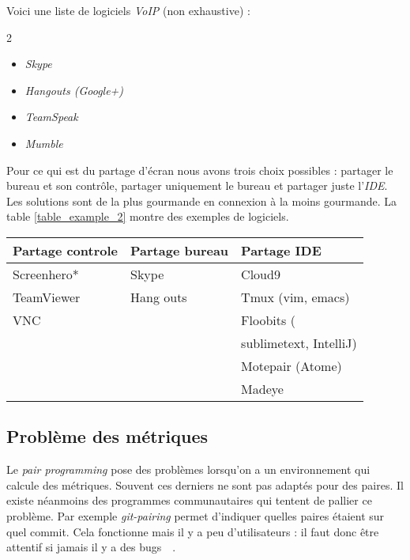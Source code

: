 \documentclass[journal, a4paper, frenchb]{IEEEtran}
\begin{document}
Voici une liste de logiciels \emph{VoIP} (non exhaustive) :

\begin{multicols}{2}
\begin{itemize}
    \item \emph{Skype}
    \item \emph{Hangouts (Google+)}
    \item \emph{TeamSpeak}
    \item \emph{Mumble}
\end{itemize}
\end{multicols}

Pour ce qui est du partage d’écran nous avons trois choix possibles : partager le bureau et son contrôle, partager uniquement le bureau et partager juste l’\emph{IDE}. Les solutions sont de la plus gourmande en connexion à la moins gourmande. La table \ref{table_example_2} montre des exemples de logiciels.

\begin{table*}[!t]
\begin{center}
    \caption{An Example of a Table 2}
    \label{table_example_2}
    \begin{tabular}{| l | l | l|}
    \hline
    Partage controle & Partage bureau & Partage IDE  \\ \hline
    Screenhero* & Skype & Cloud9 \\
    TeamViewer & Hang outs & Tmux (vim, emacs) \\ 
    VNC &  & Floobits ( \\
     & &  \hspace{1mm}  sublimetext, IntelliJ)\\
     & & Motepair (Atome) \\
     & & Madeye \\
    \hline
    \end{tabular}
\end{center}
\end{table*}

\subsection{Problème des métriques}

Le \emph{pair programming} pose des problèmes lorsqu’on a un environnement qui calcule des métriques. Souvent ces derniers ne sont pas adaptés pour des paires. Il existe néanmoins des programmes communautaires qui tentent de pallier ce problème. Par exemple \emph{git-pairing} permet d’indiquer quelles paires étaient sur quel commit. Cela fonctionne mais il y a peu d’utilisateurs : il faut donc être attentif si jamais il y a des bugs~\cite{PPIde1}~\cite{PPIde2}.
\end{document}
